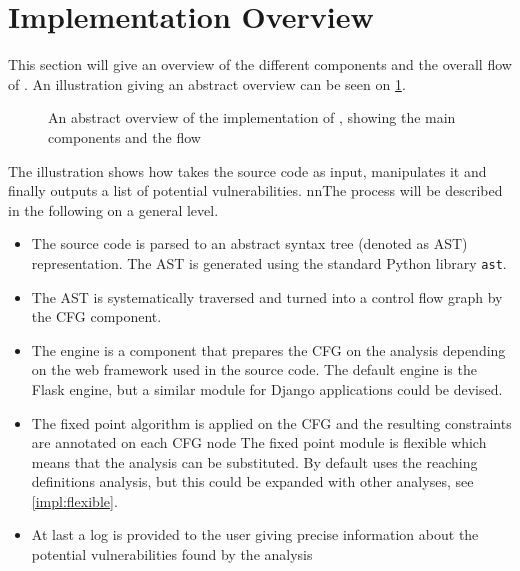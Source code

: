 \section{Implementation Overview}\label{impl:overview}
This section will give an overview of the different components and the overall flow of \pyt{}.
An illustration giving an abstract overview can be seen on \cref{figure:implementation_overview}.

\begin{figure}
  
  \caption{An abstract overview of the implementation of \pyt{}, showing the main components and the flow}
  \label{figure:implementation_overview}
\end{figure}

The illustration shows how  \pyt{} takes the source code as input, manipulates it and finally outputs a list of potential vulnerabilities.
nnThe process will be described in the following on a general level.

\begin{itemize}
\item The source code is parsed to an abstract syntax tree (denoted as AST) representation.
  The AST is generated using the standard Python library \texttt{ast}\cite{python_ast}.
\item The AST is systematically traversed and turned into a control flow graph by the CFG component.
\item The engine is a component that prepares the CFG on the analysis depending on the web framework used in the source code.
  The default engine is the Flask engine, but a similar module for Django applications could be devised.
\item The fixed point algorithm is applied on the CFG and the resulting constraints are annotated on each CFG node
  The fixed point module is flexible which means that the analysis can be substituted.
  By default \pyt{} uses the reaching definitions analysis, but this could be expanded with other analyses, see \cref{impl:flexible}.
\item At last a log is provided to the user giving precise information about the potential vulnerabilities found by the analysis
\end{itemize}

